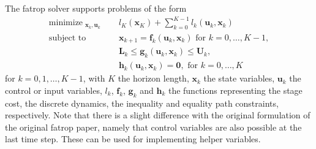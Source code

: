 \documentclass[12pt]{article}
\DeclareMathOperator*{\minimize}{minimize}
\begin{document}
The fatrop solver supports problems of the form
\begin{subequations} \label{software:eq:COCP} 
        \begin{align}
                \minimize_{\substack{\mathbf{x}_k, \mathbf{u}_k}} \quad & l_K(\mathbf{x}_K) + \sum_{k=0}^{K-1} l_k(\mathbf{u}_k, \mathbf{x}_k)          \\
                \text{subject to} \quad
                                                                                     & \mathbf{x}_{k+1} = \mathbf{f}_k(\mathbf{u}_k, \mathbf{x}_k) \text{ for }  k = 0, \dots, K-1 , \label{ch:software:eq:ocpdyn}    \\
                                                                                     & \mathbf{L}_k \leq \mathbf{g}_k(\mathbf{u}_k, \mathbf{x}_k) \leq \mathbf{U}_k, \\
                                                                                    & \mathbf{h}_k(\mathbf{u}_k, \mathbf{x}_k) =\mathbf{0}, \text{ for }  k = 0, \dots, K                        
        \end{align}
\end{subequations}
for $k = 0, 1, \dots, K-1$, with $K$ the horizon length, $\mathbf{x}_k$ the state variables, $\mathbf{u}_k$ the control or input variables, $l_k$, $\mathbf{f}_k$, $\mathbf{g}_k$ and $\mathbf{h}_k$ the functions representing the stage cost, the discrete dynamics, the inequality and equality path constraints, respectively.
Note that there is a slight difference with the original formulation of the original fatrop paper, namely that control variables are also possible at the last time step.
These can be used for implementing helper variables.
\end{document}
